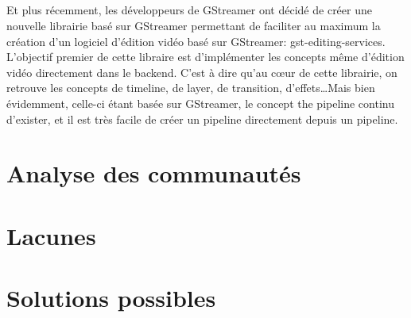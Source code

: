 \subparagraph{}

Et plus récemment, les développeurs de GStreamer ont décidé de créer
une nouvelle librairie basé sur GStreamer permettant de faciliter
au maximum la création d'un logiciel d'édition vidéo basé sur
GStreamer: gst-editing-services.  L'objectif premier de cette libraire
est d'implémenter les concepts même d'édition vidéo directement dans
le backend. C'est à dire qu'au cœur de cette librairie, on retrouve
les concepts de timeline, de layer, de transition, d'effets\ldots Mais
bien évidemment, celle-ci étant basée sur GStreamer, le concept the
pipeline continu d'exister, et il est très facile de créer un pipeline
directement depuis un pipeline.


\newpage \section{Analyse des communautés}

\newpage \section{Lacunes}
\newpage \section{Solutions possibles}
